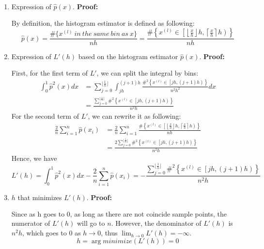 \documentclass{article}
\begin{document}
\begin{enumerate}
\begin{enumerate}
		      \setlength\parindent{2em}
		      \item Expression of $\hat{p}(x)$.\newline
		      {\bf Proof:}
          \par By definition, the histogram estimator is defined as following:
          \[\hat{p}(x)=\frac{\#\{x^{(l)}\ in\ the\ same\ bin\ as\ x\}}{nh}=\frac{\#\left\{x^{(l)}\in\left[\left\lfloor{\frac{x}{h}}\right\rfloor h,\left\lceil{\frac{x}{h}}\right\rceil h\right)\right\}}{nh}\]
		      \item Expression of $L'(h)$ based on the histogram estimator $\hat{p}(x)$.\newline
		      {\bf Proof:}
		      \par First, for the first term of $L'$, we can split the integral by bins:
          \begin{align*}
            \int_0^1\hat{p}^2(x)dx &= \sum_{j=0}^{\lfloor\frac{1}{h}\rfloor}\int_{jh}^{(j+1)h}\frac{\#^2\left\{x^{(l)}\in\left[jh, (j+1)h\right)\right\}}{n^2h^2}dx\\
            &= \frac{\sum_{j=0}^{\lfloor\frac{1}{h}\rfloor}\#^2\left\{x^{(l)}\in\left[jh, (j+1)h\right)\right\}}{n^2h}
          \end{align*}
          For the second term of $L'$, we can rewrite it as following:
          \begin{align*}
            \frac{2}{n}\sum_{i=1}^n\hat{p}(x_i) &= \frac{2}{n}\sum_{i=1}^n\frac{\#\left\{x^{(l)}\in\left[\left\lfloor{\frac{x}{h}}\right\rfloor h,\left\lceil{\frac{x}{h}}\right\rceil h\right)\right\}}{nh}\\
            &= \frac{2\sum_{j=0}^{\lfloor\frac{1}{h}\rfloor}\#^2\left\{x^{(l)}\in\left[jh, (j+1)h\right)\right\}}{n^2h}
          \end{align*}
          Hence, we have
          \[L'(h)=\int_0^1\hat{p}^2(x)dx-\frac{2}{n}\sum_{i=1}^n\hat{p}(x_i)=-\frac{\sum_{j=0}^{\lfloor\frac{1}{h}\rfloor}\#^2\left\{x^{(l)}\in\left[jh, (j+1)h\right)\right\}}{n^2h}\]
		      \item $h$ that minimizes $L'(h)$.\newline
		      {\bf Proof:}
          \par Since as h goes to 0, as long as there are not coincide sample points, the numerator of $L'(h)$ will go to $n$. However, the denominator of $L'(h)$ is $n^2h$, which goes to 0 as $h\to 0$, thus $\lim_{h\to 0}L'(h) = -\infty$.
          \[h = \arg minimize(L'(h)) = 0\]

\end{enumerate}
\end{enumerate}
\end{document}
